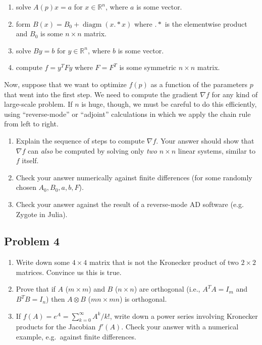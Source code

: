 \documentclass[10pt,oneside]{article}
\newcommand{\diagm}{\operatorname{diagm}}
\newcommand{\dotstar}{\mathbin{.*}}
\begin{document}
\begin{enumerate}
    \item solve $A(p) x = a$ for $x \in \mathbb{R}^n$, where $a$ is some vector.
    \item form $B(x) = B_0 + \diagm(x \dotstar x)$ where $\dotstar$ is the elementwise product and $B_0$ is some $n\times n$ matrix.
    \item solve $By = b$ for $y \in \mathbb{R}^n$, where $b$ is some vector.
    \item compute $f = y^T F y$ where $F = F^T$ is some symmetric $n \times n$ matrix.
\end{enumerate}

Now, suppose that we want to optimize $f(p)$ as a function of the parameters $p$ that went into the first step.  We need to compute the gradient $\nabla f$ for any kind of large-scale problem.   If $n$ is huge, though, we must be careful to do this efficiently, using ``reverse-mode'' or ``adjoint'' calculations in which we apply the chain rule from left to right.

\begin{enumerate}[label=\alph*)]

\item Explain the sequence of steps to compute $\nabla f$.   Your answer should show that $\nabla f$ can \emph{also} be computed by solving only \emph{two} $n \times n$ linear systems, similar to $f$ itself.

\item Check your answer numerically against finite differences (for some randomly chosen $A_0, B_0, a, b, F$).

\item Check your answer against the result of a reverse-mode AD software (e.g. Zygote in Julia).

\end{enumerate}

\subsection*{Problem 4}

\begin{enumerate}[label=\alph*)]

\item Write down some $4 \times 4$ matrix that is not the
Kronecker product of two $2 \times 2$ matrices.  Convince
us this is true.

\item Prove that if $A$ ($m \times m$) and $B$ ($n \times n$) are orthogonal (i.e.,
$A^TA=I_m$ and $B^TB=I_n$) then $A \otimes B$ ($mn \times mn$) is orthogonal.

\item If $f(A) = e^A= \sum_{k=0}^\infty A^k/k!$, write down
a power series involving Kronecker products for the
Jacobian $f'(A)$.  Check your answer with a numerical example, e.g.~against finite differences.

\end{enumerate}
\end{document}
